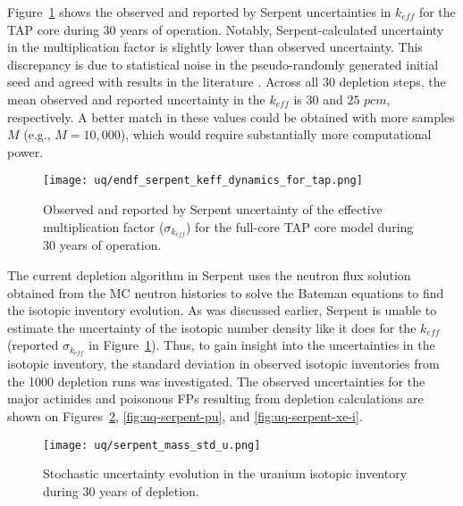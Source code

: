 Figure~\ref{fig:uq-serpent-keff-evolution} shows the observed and reported by 
Serpent uncertainties in $k_{eff}$ for the \gls{TAP} core during 30 years of 
operation. Notably, Serpent-calculated uncertainty in the multiplication 
factor is slightly lower than observed uncertainty. This discrepancy is due to 
statistical noise in the pseudo-randomly generated initial seed and agreed 
with results in the literature 
\cite{wyant_numerical_2012}. Across all 30 depletion steps, the mean observed 
and reported uncertainty in the $k_{eff}$ is $30$ and $25$ $pcm$, 
respectively. A better match in these values could be obtained with more 
samples $M$ (e.g., $M=10,\!000$), which would require substantially more 
computational power.
\begin{figure}[hbp!] %
	\centering
	\texttt{[image: uq/endf\_serpent\_keff\_dynamics\_for\_tap.png]}
	\caption{Observed and reported by Serpent uncertainty of the effective 
	multiplication factor ($\sigma_{k_{eff}}$) for the full-core \gls{TAP} 
	core model during 30 years of operation.}
	\label{fig:uq-serpent-keff-evolution}
\end{figure}

The current depletion algorithm in Serpent uses the neutron flux solution 
obtained from the \gls{MC} neutron histories to solve the Bateman equations to 
find the isotopic inventory evolution. As was discussed earlier, Serpent 
is unable to estimate the uncertainty of the isotopic number density like it 
does for the $k_{eff}$ (reported $\sigma_{k_{eff}}$ in 
Figure~\ref{fig:uq-serpent-keff-evolution}). Thus, to gain insight into the 
uncertainties in the isotopic inventory, the standard deviation in observed 
isotopic inventories from the 1000 depletion runs was investigated. The 
observed uncertainties for the major actinides and poisonous \glspl{FP} 
resulting from depletion calculations are shown on  
Figures~\ref{fig:uq-serpent-u}, \ref{fig:uq-serpent-pu}, and 
\ref{fig:uq-serpent-xe-i}.

\begin{figure}[htp!] %
	\centering
	\texttt{[image: uq/serpent\_mass\_std\_u.png]}
		\vspace{-4mm}
	\caption{Stochastic uncertainty evolution in the uranium isotopic 
	inventory during 30 years of depletion.}
	\label{fig:uq-serpent-u}
\end{figure}

